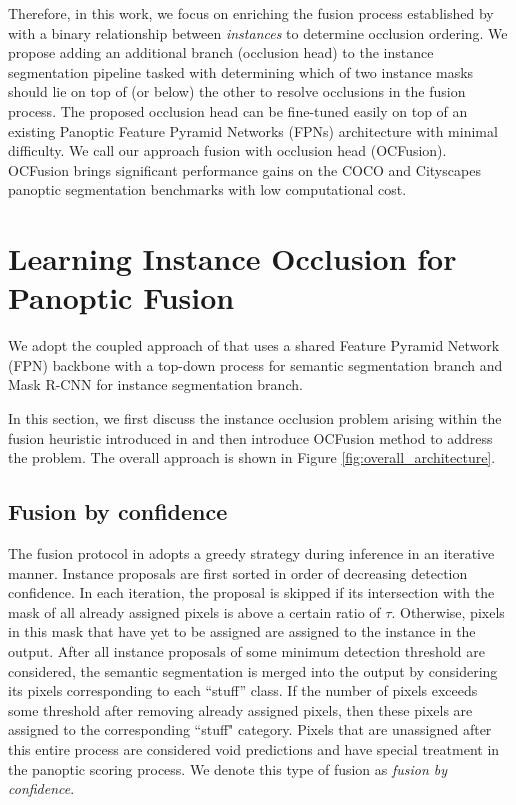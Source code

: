 \documentclass[10pt,twocolumn,letterpaper]{article}
\begin{document}
Therefore, in this work, we focus on enriching the fusion process established by \cite{kirillov2018panoptic} with a binary relationship between \textit{instances} to determine occlusion ordering. We propose adding an additional branch (occlusion head) to the instance segmentation pipeline tasked with determining which of two instance masks should lie on top of (or below) the other to resolve occlusions in the fusion process. The proposed occlusion head can be fine-tuned easily on top of an existing Panoptic Feature Pyramid Networks (FPNs) \cite{kirillov2019panoptic} architecture with minimal difficulty. We call our approach fusion with occlusion head (OCFusion). OCFusion brings significant performance gains on the COCO and Cityscapes panoptic segmentation benchmarks with low computational cost. 

\section{Learning Instance Occlusion for Panoptic Fusion}


We adopt the coupled approach of \cite{kirillov2019panoptic} that uses a shared Feature Pyramid Network (FPN) \cite{FPN} backbone with a top-down process for semantic segmentation branch and Mask R-CNN \cite{he2017mask} for instance segmentation branch.

In this section, we first discuss the instance occlusion problem arising within the fusion heuristic introduced in \cite{kirillov2018panoptic} and then introduce OCFusion method to address the problem. The overall approach is shown in Figure \ref{fig:overall_architecture}.

\subsection{Fusion by confidence} \label{fusing-instances}

The fusion protocol in \cite{kirillov2018panoptic} adopts a greedy strategy during inference in an iterative manner. Instance proposals are first sorted in order of decreasing detection confidence. In each iteration, the proposal is skipped if its intersection with the mask of all already assigned pixels is above a certain ratio of $\tau$. Otherwise, pixels in this mask that have yet to be assigned are assigned to the instance in the output. After all instance proposals of some minimum detection threshold are considered, the semantic segmentation is merged into the output by considering its pixels corresponding to each ``stuff'' class. If the number of pixels exceeds some threshold after removing already assigned pixels, then these pixels are assigned to the corresponding ``stuff" category. Pixels that are unassigned after this entire process are considered void predictions and have special treatment in the panoptic scoring process. We denote this type of fusion as \textit{fusion by confidence}.
\end{document}
